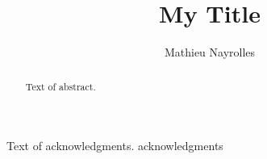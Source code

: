 
\author{Mathieu Nayrolles}
\title{My Title}
\PhD                            %
\cosupervisor                   %




\begin{abstract}
  Text of abstract.  
\end{abstract}

\begin{acknowledgments}
  Text of acknowledgments.
  acknowledgments

\end{acknowledgments}



